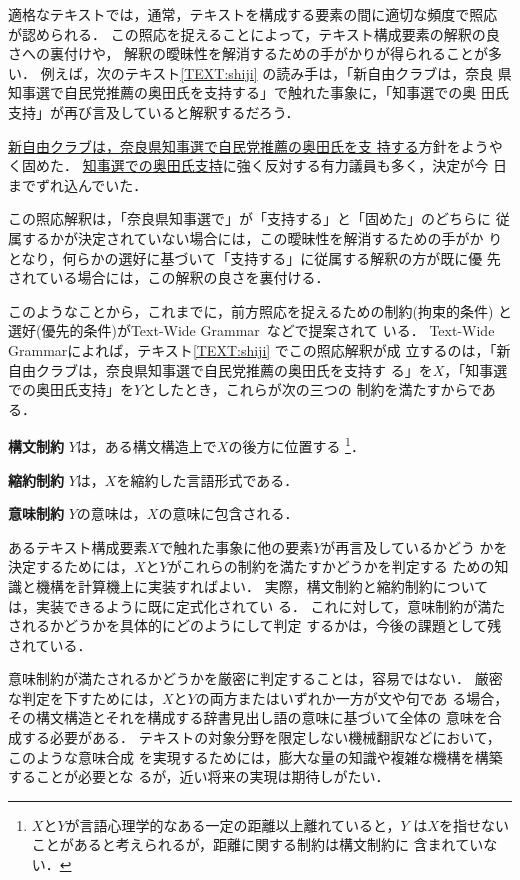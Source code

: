 適格なテキストでは，通常，テキストを構成する要素の間に適切な頻度で照応
が認められる．
この照応を捉えることによって，テキスト構成要素の解釈の良さへの裏付けや，
解釈の曖昧性を解消するための手がかりが得られることが多い．
例えば，次のテキスト\ref{TEXT:shiji} の読み手は，「新自由クラブは，奈良
県知事選で自民党推薦の奥田氏を支持する」で触れた事象に，「知事選での奥
田氏支持」が再び言及していると解釈するだろう．
\begin{TEXT}
\text \underline{新自由クラブは，奈良県知事選で自民党推薦の奥田氏を支
持する}方針をようやく固めた．
\underline{知事選での奥田氏支持}に強く反対する有力議員も多く，決定が今
日までずれ込んでいた．\label{TEXT:shiji}
\end{TEXT}
この照応解釈は，「奈良県知事選で」が「支持する」と「固めた」のどちらに
従属するかが決定されていない場合には，この曖昧性を解消するための手がか
りとなり，何らかの選好に基づいて「支持する」に従属する解釈の方が既に優
先されている場合には，この解釈の良さを裏付ける．

このようなことから，これまでに，前方照応を捉えるための制約(拘束的条件)
と選好(優先的条件)がText-Wide Grammar~\cite{Jelinek95}などで提案されて
いる．
Text-Wide Grammarによれば，テキスト\ref{TEXT:shiji} でこの照応解釈が成
立するのは，「新自由クラブは，奈良県知事選で自民党推薦の奥田氏を支持す
る」を$X$，「知事選での奥田氏支持」を$Y$としたとき，これらが次の三つの
制約を満たすからである．
\smallskip
\begin{LIST}
\item[\bf 構文制約] $Y$は，ある構文構造上で$X$の後方に位置する
\footnote{$X$と$Y$が言語心理学的なある一定の距離以上離れていると，$Y$
は$X$を指せないことがあると考えられるが，距離に関する制約は構文制約に
含まれていない．}．
\item[\bf 縮約制約] $Y$は，$X$を縮約した言語形式である．
\item[\bf 意味制約] $Y$の意味は，$X$の意味に包含される．
\end{LIST}
\smallskip
あるテキスト構成要素$X$で触れた事象に他の要素$Y$が再言及しているかどう
かを決定するためには，$X$と$Y$がこれらの制約を満たすかどうかを判定する
ための知識と機構を計算機上に実装すればよい．
実際，構文制約と縮約制約については，実装できるように既に定式化されてい
る．
これに対して，意味制約が満たされるかどうかを具体的にどのようにして判定
するかは，今後の課題として残されている．

意味制約が満たされるかどうかを厳密に判定することは，容易ではない．
厳密な判定を下すためには，$X$と$Y$の両方またはいずれか一方が文や句であ
る場合，その構文構造とそれを構成する辞書見出し語の意味に基づいて全体の
意味を合成する必要がある．
テキストの対象分野を限定しない機械翻訳などにおいて，このような意味合成
を実現するためには，膨大な量の知識や複雑な機構を構築することが必要とな
るが，近い将来の実現は期待しがたい． 

